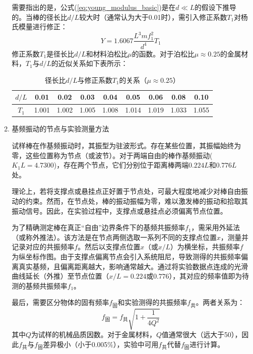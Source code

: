 \documentclass[11pt]{article}
\begin{document}
\begin{enumerate}
需要指出的是，公式(\ref{eq:young_modulus_basic})是在$d \ll L$的假设下推导的。当棒的径长比$d/L$较大时（通常认为大于0.01时），需引入修正系数$T_1$对杨氏模量进行修正：
\begin{equation}
Y = 1.6067 \frac{L^3 m f_1^2}{d^4} T_1
\label{eq:young_modulus_corrected}
\end{equation}
修正系数$T_1$是径长比$d/L$和材料泊松比$\mu$的函数。对于泊松比$\mu \approx 0.25$的金属材料，$T_1$与$d/L$的近似关系如下表所示：
\begin{table}[H]
\centering
\caption{径长比$d/L$与修正系数$T_1$的关系（$\mu \approx 0.25$）}
\label{tab:correction_factor}
\begin{tabular}{ccccccccc}
\toprule
$d/L$ & 0.01 & 0.02 & 0.03 & 0.04 & 0.05 & 0.06 & 0.08 & 0.10 \\
\midrule
$T_1$ & 1.001 & 1.002 & 1.005 & 1.008 & 1.014 & 1.019 & 1.033 & 1.055 \\
\bottomrule
\end{tabular}
\end{table}

\item 基频振动的节点与实验测量方法 \par
试样棒在作基频振动时，其振型为驻波形式。存在某些位置，其振幅始终为零，这些位置称为节点（或波节）。对于两端自由的棒作基频振动($K_1 L = 4.7300$)，存在两个节点，它们分别位于距离棒两端$0.224L$和$0.776L$处。

理论上，若将支撑点或悬挂点正好置于节点处，可最大程度地减少对棒自由振动的约束。然而，在节点处，棒的振动振幅为零，难以激发棒的振动和拾取其振动信号。因此，在实验过程中，支撑点或悬挂点必须偏离节点位置。

为了精确测定棒在真正“自由”边界条件下的基频共振频率$f_1$，需采用外延法（或称外推法）。该方法是在节点两侧选取一系列不同的支撑点位置$x$，测量并记录对应的共振频率$f$。然后以支撑点位置$x$（或$x/L$）为横坐标，共振频率$f$为纵坐标作图。由于支撑点偏离节点会引入系统阻尼，导致测得的共振频率偏离真实基频，且偏离距离越大，影响通常越大。通过将实验数据点连成的光滑曲线延长（外推）至节点位置（$x/L = 0.224$或$0.776$），其对应的频率值即为待测的基频共振频率$f_1$。

最后，需要区分物体的固有频率$f_{\text{固}}$和实验测得的共振频率$f_{\text{共}}$。两者关系为：
\begin{equation}
f_{\text{固}} = f_{\text{共}} \sqrt{1 + \frac{1}{4Q^2}}
\end{equation}
其中$Q$为试样的机械品质因数。对于金属材料，$Q$值通常很大（远大于50），因此$f_{\text{共}}$与$f_{\text{固}}$差异极小（小于0.005\%），实验中可用$f_{\text{共}}$代替$f_{\text{固}}$进行计算。

\end{enumerate}
\end{document}
